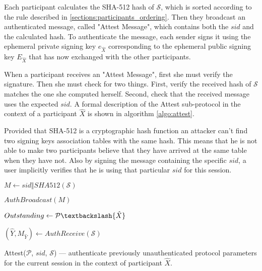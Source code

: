 Each participant calculates the SHA-512 hash of $\mathcal{S}$, which is sorted according to the rule described in \ref{sections:participants_ordering}. Then they broadcast an authenticated message, called "Attest Message", which contains both the $sid$ and the calculated hash. To authenticate the message, each sender signs it using the ephemeral private signing key $e_{\hat{X}}$ corresponding to the ephemeral public signing key $E_{\hat{X}}$ that has now exchanged with the other participants.

When a participant receives an "Attest Message", first she must verify the signature. Then she must check for two things. First, verify the received hash of $\mathcal{S}$ matches the one she computed herself. Second, check that the received message uses the expected $sid$. A formal description of the Attest sub-protocol in the context of a participant $\hat{X}$ is shown in algorithm \ref{algo:attest}.

Provided that SHA-512 is a cryptographic hash function an attacker can't find two signing keys association tables with the same hash. This means that he is not able to make two participants believe that they have arrived at the same table when they have not. Also by signing the message containing the specific $sid$, a user implicitly verifies that he is using that particular $sid$ for this session.

\begin{algorithm}[H]
  \Begin
  {	
	$M \leftarrow sid \Vert SHA512(\mathcal{S})$
	
	$AuthBroadcast(M)$
	
	$Outstanding \leftarrow \mathcal{P} \textbackslash \{\hat{X}\}$

    {
      $(\hat{Y}, M_{\hat{Y}}) \leftarrow AuthReceive(\mathcal{S})$
      
      {     
        \Return{$\perp$}            
        
      }
    }

  }
  \caption{Attest($\mathcal{P}$, $sid$, $\mathcal{S}$) --- authenticate previously unauthenticated protocol parameters for the current session in the context of participant $\hat{X}$.}
  \label{algo:attest}
\end{algorithm}

